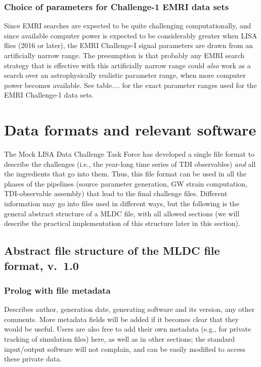 \documentclass[11pt]{report}
\begin{document}
\subsection{Choice of parameters for Challenge-1 EMRI data sets}
Since EMRI searches are expected to be quite challenging computationally, and since
available computer power is expected to be considerably greater when LISA flies (2016 or later),
the EMRI Challenge-I signal parameters are drawn from an artificially narrow range. 
The presumption is that probably any EMRI search strategy that is effective with this 
artificially narrow range could {\it also} work as a search over an astrophysically realistic 
parameter range, when more computer power becomes available.
See table.... for the exact parameter ranges used for the EMRI Challenge-1 data sets.




%
%

\chapter{Data formats and relevant software}

The Mock LISA Data Challenge Task Force has developed
a single file format to describe the challenges (i.e., the year-long time series of TDI observables) \emph{and} all the ingredients
that go into them. Thus, this file format can be used in all the phases of the pipelines (source parameter generation, GW strain computation, TDI-observable assembly) that lead to the final challenge files. Different information may go into files used in different ways, but the following is the general abstract structure of a MLDC file, with all allowed sections (we will describe the practical implementation of this structure later in this section).

\section{Abstract file structure of the MLDC file format, v.\ 1.0}

\subsection{Prolog with file metadata}

Describes author, generation date, generating software and its version, any other comments. More metadata fields will be added
if it becomes clear that they would be useful. Users are also
free to add their own metadata (e.g., for private tracking
of simulation files) here, as well as in other sections; the standard input/output software will not complain, and can be easily modified
to access these private data.
\end{document}
